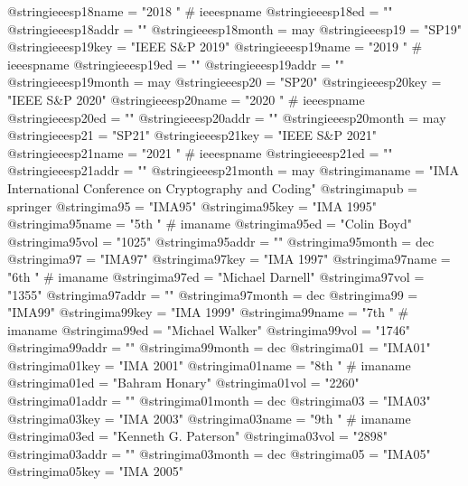 @string{ieeesp18name =          "2018 " # ieeespname}
@string{ieeesp18ed =            ""}
@string{ieeesp18addr =          ""}
@string{ieeesp18month =         may}
@string{ieeesp19 =              "SP19"}
@string{ieeesp19key =           "IEEE S\&P 2019"}
@string{ieeesp19name =          "2019 " # ieeespname}
@string{ieeesp19ed =            ""}
@string{ieeesp19addr =          ""}
@string{ieeesp19month =         may}
@string{ieeesp20 =              "SP20"}
@string{ieeesp20key =           "IEEE S\&P 2020"}
@string{ieeesp20name =          "2020 " # ieeespname}
@string{ieeesp20ed =            ""}
@string{ieeesp20addr =          ""}
@string{ieeesp20month =         may}
@string{ieeesp21 =              "SP21"}
@string{ieeesp21key =           "IEEE S\&P 2021"}
@string{ieeesp21name =          "2021 " # ieeespname}
@string{ieeesp21ed =            ""}
@string{ieeesp21addr =          ""}
@string{ieeesp21month =         may}
@string{imaname =               "IMA International Conference on Cryptography and Coding"}
@string{imapub =                springer}
@string{ima95 =                 "IMA95"}
@string{ima95key =              "IMA 1995"}
@string{ima95name =             "5th " # imaname}
@string{ima95ed =               "Colin Boyd"}
@string{ima95vol =              "1025"}
@string{ima95addr =             ""}
@string{ima95month =            dec}
@string{ima97 =                 "IMA97"}
@string{ima97key =              "IMA 1997"}
@string{ima97name =             "6th " # imaname}
@string{ima97ed =               "Michael Darnell"}
@string{ima97vol =              "1355"}
@string{ima97addr =             ""}
@string{ima97month =            dec}
@string{ima99 =                 "IMA99"}
@string{ima99key =              "IMA 1999"}
@string{ima99name =             "7th " # imaname}
@string{ima99ed =               "Michael Walker"}
@string{ima99vol =              "1746"}
@string{ima99addr =             ""}
@string{ima99month =            dec}
@string{ima01 =                 "IMA01"}
@string{ima01key =              "IMA 2001"}
@string{ima01name =             "8th " # imaname}
@string{ima01ed =               "Bahram Honary"}
@string{ima01vol =              "2260"}
@string{ima01addr =             ""}
@string{ima01month =            dec}
@string{ima03 =                 "IMA03"}
@string{ima03key =              "IMA 2003"}
@string{ima03name =             "9th " # imaname}
@string{ima03ed =               "Kenneth G. Paterson"}
@string{ima03vol =              "2898"}
@string{ima03addr =             ""}
@string{ima03month =            dec}
@string{ima05 =                 "IMA05"}
@string{ima05key =              "IMA 2005"}
